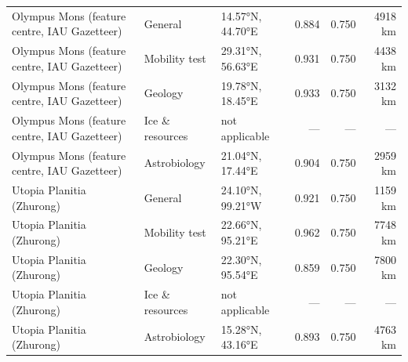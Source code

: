 \begin{table}[ht]
\begin{tabular}{lllrrr}
Olympus Mons (feature centre, IAU Gazetteer) & General & 14.57°N, 44.70°E & 0.884 & 0.750 & 4918 km \\
Olympus Mons (feature centre, IAU Gazetteer) & Mobility test & 29.31°N, 56.63°E & 0.931 & 0.750 & 4438 km \\
Olympus Mons (feature centre, IAU Gazetteer) & Geology & 19.78°N, 18.45°E & 0.933 & 0.750 & 3132 km \\
Olympus Mons (feature centre, IAU Gazetteer) & Ice \& resources & not applicable & — & — & — \\
Olympus Mons (feature centre, IAU Gazetteer) & Astrobiology & 21.04°N, 17.44°E & 0.904 & 0.750 & 2959 km \\
Utopia Planitia (Zhurong) & General & 24.10°N, 99.21°W & 0.921 & 0.750 & 1159 km \\
Utopia Planitia (Zhurong) & Mobility test & 22.66°N, 95.21°E & 0.962 & 0.750 & 7748 km \\
Utopia Planitia (Zhurong) & Geology & 22.30°N, 95.54°E & 0.859 & 0.750 & 7800 km \\
Utopia Planitia (Zhurong) & Ice \& resources & not applicable & — & — & — \\
Utopia Planitia (Zhurong) & Astrobiology & 15.28°N, 43.16°E & 0.893 & 0.750 & 4763 km \\
\hline
\end{tabular}
\end{table}
